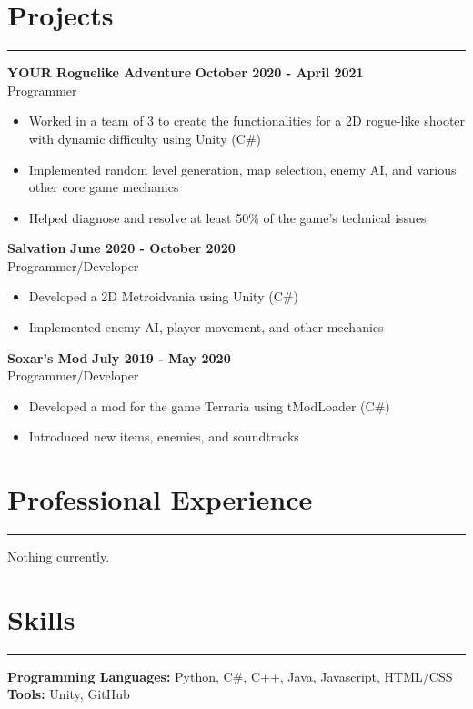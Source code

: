 \documentclass{article}
\begin{document}
\section*{Projects} \vspace{-6pt} \hrule \vspace{6pt}
\textbf{YOUR Roguelike Adventure} \hfill \textbf{October 2020 - April 2021}\\
Programmer
\begin{itemize}
	\item\vspace{-6pt} Worked in a team of 3 to create the functionalities for a 2D rogue-like shooter with dynamic difficulty using Unity (C$\#$)
	\item\vspace{-6pt} Implemented random level generation, map selection, enemy AI, and various other core game mechanics
	\item\vspace{-6pt} Helped diagnose and resolve at least 50\% of the game's technical issues
\end{itemize}
\vspace{-6pt}
\textbf{Salvation} \hfill \textbf{June 2020 - October 2020}\\
Programmer/Developer
\begin{itemize}
	\item\vspace{-6pt} Developed a 2D Metroidvania using Unity (C$\#$)
	\item\vspace{-6pt} Implemented enemy AI, player movement, and other mechanics
\end{itemize}
\vspace{-6pt}
\textbf{Soxar's Mod} \hfill \textbf{July 2019 - May 2020}\\
Programmer/Developer
\begin{itemize}
	\item\vspace{-6pt} Developed a mod for the game Terraria using tModLoader (C$\#$)
	\item\vspace{-6pt} Introduced new items, enemies, and soundtracks
\end{itemize}
\vspace{-20pt}


\section*{Professional Experience} \vspace{-6pt} \hrule \vspace{6pt}
Nothing currently.
\vspace{-10pt}

\section*{Skills} \vspace{-6pt} \hrule \vspace{6pt}
\textbf{Programming Languages:} Python, C$\#$, C++, Java, Javascript, HTML/CSS\\
\textbf{Tools:} Unity, GitHub
\end{document}
